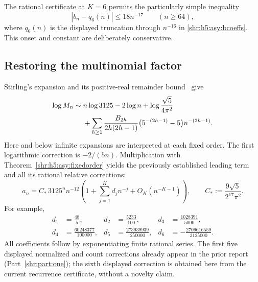 \documentclass[11pt,letterpaper]{article}
\numberwithin{equation}{section}
\theoremstyle{definition}
\newcommand{\1}{\mathbf 1}
\begin{document}
The rational certificate at $K=6$ permits the particularly simple
inequality
\begin{equation}
 |b_n-q_6(n)|\le18n^{-17}\qquad(n\ge64),
 \label{shr:h5:asy:explicit6}
\end{equation}
where $q_6(n)$ is the displayed truncation through $n^{-16}$ in
\eqref{shr:h5:asy:bcoeffs}. This onset and constant are deliberately conservative.

\subsection{Restoring the multinomial factor}
Stirling's expansion and its positive-real remainder bound~\cite{DLMFgamma} give
\begin{align}
 \log M_n\sim{}&n\log3125-2\log n+\log\frac{\sqrt5}{4\pi^2}\notag\\
 &+\sum_{h\ge1}\frac{B_{2h}}{2h(2h-1)}
       \bigl(5^{-(2h-1)}-5\bigr)n^{-(2h-1)}.
 \label{shr:h5:asy:stirling}
\end{align}
Here and below infinite expansions are interpreted at each fixed order.
The first logarithmic correction is $-2/(5n)$. Multiplication with
Theorem~\ref{shr:h5:asy:fixedorder} yields the previously established leading term
and all its rational relative corrections:
\begin{equation}
 a_n=C_*\,3125^n n^{-12}
       \left(1+\sum_{j=1}^Kd_jn^{-j}+O_K(n^{-K-1})\right),
 \qquad C_*:=\frac{9\sqrt5}{2^{17}\pi^2}.
 \label{shr:h5:asy:count}
\end{equation}
For example,
\begin{align*}
 d_1&=\frac{48}{5},& d_2&=\frac{5233}{100},&
 d_3&=\frac{1028391}{5000},\\
 d_4&=\frac{60248377}{100000},&
 d_5&=\frac{273939939}{250000},&
 d_6&=-\frac{2709616559}{3125000}.
\end{align*}
All coefficients follow by exponentiating finite rational series. The first
five displayed normalized and count corrections already appear in the prior
report (Part~\ref{shr:part:one}); the sixth displayed correction is obtained here from
the current recurrence certificate, without a novelty claim.
\end{document}
